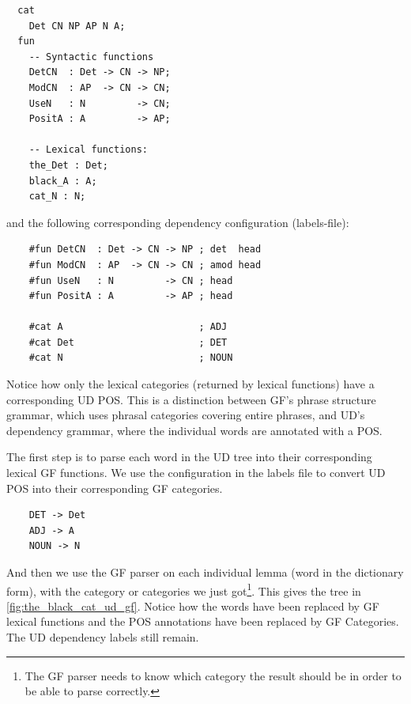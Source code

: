 \begin{verbatim}
  cat
    Det CN NP AP N A;
  fun
    -- Syntactic functions
    DetCN  : Det -> CN -> NP;
    ModCN  : AP  -> CN -> CN;
    UseN   : N         -> CN;
    PositA : A         -> AP;

    -- Lexical functions:
    the_Det : Det;
    black_A : A;
    cat_N : N;
\end{verbatim}
and the following corresponding dependency configuration (labels-file):
\begin{verbatim}
    #fun DetCN  : Det -> CN -> NP ; det  head
    #fun ModCN  : AP  -> CN -> CN ; amod head
    #fun UseN   : N         -> CN ; head
    #fun PositA : A         -> AP ; head
    
    #cat A                        ; ADJ
    #cat Det                      ; DET
    #cat N                        ; NOUN
\end{verbatim}

Notice how only the lexical categories (returned by lexical functions) have a corresponding UD POS. This is a distinction between GF's phrase structure grammar, which uses phrasal categories covering entire phrases, and UD's dependency grammar, where the individual words are annotated with a POS.

The first step is to parse each word in the UD tree into their corresponding lexical GF functions. We use the configuration in the labels file to convert UD POS into their corresponding GF categories.
\begin{verbatim}
    DET -> Det
    ADJ -> A
    NOUN -> N
\end{verbatim}
And then we use the GF parser on each individual lemma (word in the dictionary form), with the category or categories we just got\footnote{The GF parser needs to know which category the result should be in order to be able to parse correctly.}. %
This gives the tree in \autoref{fig:the_black_cat_ud_gf}. Notice how the words have been replaced by GF lexical functions and the POS annotations have been replaced by GF Categories. The UD dependency labels still remain.

